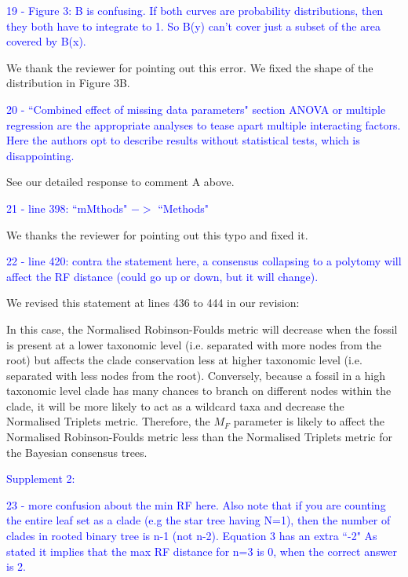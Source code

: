 \documentclass[11pt]{letter}
\begin{document}
\begin{letter}{}
\textcolor{blue}{19 - Figure 3: B is confusing. If both curves are probability distributions, then they both have to integrate to 1. So B(y) can't cover just a subset of the area covered by B(x).}

We thank the reviewer for pointing out this error. We fixed the shape of the distribution in Figure 3B.


\textcolor{blue}{20 - ``Combined effect of missing data parameters" section ANOVA or multiple regression are the appropriate analyses to tease apart multiple interacting factors. Here the authors opt to describe results without statistical tests, which is disappointing.}

See our detailed response to comment A above.


\textcolor{blue}{21 - line 398: ``mMthods" $->$ ``Methods"}

We thanks the reviewer for pointing out this typo and fixed it.

\textcolor{blue}{22 - line 420: contra the statement here, a consensus collapsing to a polytomy will affect the RF distance (could go up or down, but it will change).}

We revised this statement at lines 436 to 444 in our revision:

\hfill\begin{minipage}{\dimexpr\textwidth-1cm}
In this case, the Normalised Robinson-Foulds metric will decrease when the fossil is present at a lower taxonomic level (i.e. separated with more nodes from the root) but affects the clade conservation less at higher taxonomic level (i.e. separated with less nodes from the root). Conversely, because a fossil in a high taxonomic level clade has many chances to branch on different nodes within the clade, it will be more likely to act as a wildcard taxa and decrease the Normalised Triplets metric. Therefore, the $M_{F}$ parameter is likely to affect the Normalised Robinson-Foulds metric less than the Normalised Triplets metric for the Bayesian consensus trees.
\end{minipage}

\textcolor{blue}{Supplement 2:}

\textcolor{blue}{23 - more confusion about the min RF here. Also note that if you are counting the entire leaf set as a clade (e.g the star tree having N=1), then the number of clades in rooted binary tree is n-1 (not n-2). Equation 3 has an extra ``-2" As stated it implies that the max RF distance for n=3 is 0, when the correct answer is 2.}


\end{letter}
\end{document}
